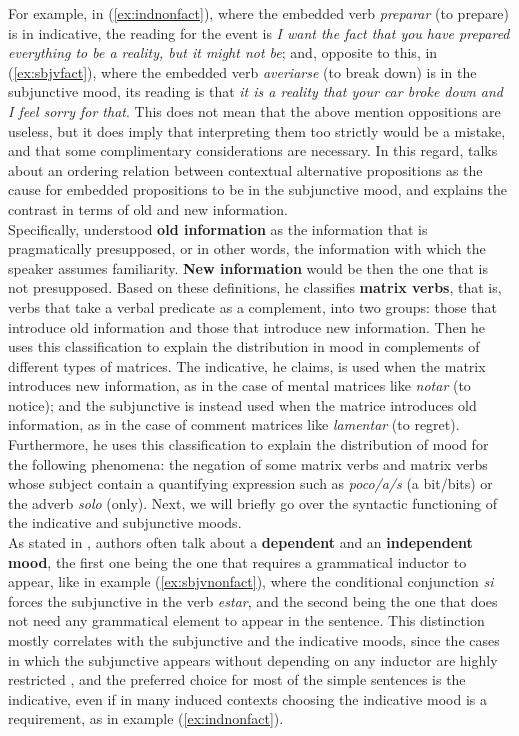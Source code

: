 For example, in (\ref{ex:indnonfact}), where the embedded verb \textit{preparar} (to prepare) is in indicative, the reading for the event is \textit{I want the fact that you have prepared everything to be a reality, but it might not be}; and, opposite to this, in (\ref{ex:sbjvfact}), where the embedded verb \textit{averiarse} (to break down) is in the subjunctive mood, its reading is that \textit{it is a reality that your car broke down and I feel sorry for that}. This does not mean that the above mention oppositions are useless, but it does imply that interpreting them too strictly would be a mistake, and that some complimentary considerations are necessary. In this regard, \citet{villalta2008mood} talks about an ordering relation between contextual alternative propositions as the cause for embedded propositions to be in the subjunctive mood, and \citet{mejias1998pragmatic} explains the contrast in terms of old and new information.\\ 

Specifically, \citet{mejias1998pragmatic} understood \textbf{old information} as the information that is pragmatically presupposed, or in other words, the information with which the speaker assumes familiarity. \textbf{New information} would be then the one that is not presupposed. Based on these definitions, he classifies \textbf{matrix verbs}, that is, verbs that take a verbal predicate as a complement, into two groups: those that introduce old information and those that introduce new information. Then he uses this classification to explain the distribution in mood in complements of different types of matrices. The indicative, he claims, is used when the matrix introduces new information, as in the case of mental matrices like \textit{notar} (to notice); and the subjunctive is instead used when the matrice introduces old information, as in the case of comment matrices like  \textit{lamentar} (to regret). Furthermore, he uses this classification to explain the distribution of mood for the following phenomena: the negation of some matrix verbs and matrix verbs whose subject contain a quantifying expression such as \textit{poco/a/s} (a bit/bits) or the adverb \textit{solo} (only). Next, we will briefly go over the syntactic functioning of the indicative and subjunctive moods.\\

As stated in \citet{espanola2010nueva}, authors often talk about a \textbf{dependent} and an \textbf{independent mood}, the first one being the one that requires a grammatical inductor to appear, like in example (\ref{ex:sbjvnonfact}), where the conditional conjunction \textit{si} forces the subjunctive in the verb \textit{estar}, and the second being the one that does not need any grammatical element to appear in the sentence. This distinction mostly correlates with the subjunctive and the indicative moods, since the cases in which the subjunctive appears without depending on any inductor are highly restricted \citep{espanola2010nueva}, and the preferred choice for most of the simple sentences is the indicative, even if in many induced contexts choosing the indicative mood is a requirement, as in example (\ref{ex:indnonfact}).\\

